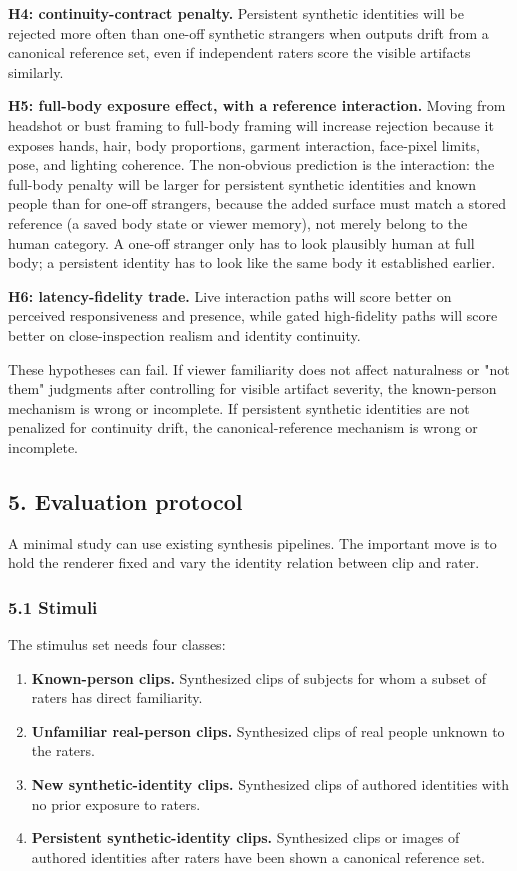\documentclass[
]{article}
\providecommand{\tightlist}{%
  \setlength{\itemsep}{0pt}\setlength{\parskip}{0pt}}
\begin{document}
\textbf{H4: continuity-contract penalty.} Persistent synthetic
identities will be rejected more often than one-off synthetic strangers
when outputs drift from a canonical reference set, even if independent
raters score the visible artifacts similarly.

\textbf{H5: full-body exposure effect, with a reference interaction.}
Moving from headshot or bust framing to full-body framing will increase
rejection because it exposes hands, hair, body proportions, garment
interaction, face-pixel limits, pose, and lighting coherence. The
non-obvious prediction is the interaction: the full-body penalty will be
larger for persistent synthetic identities and known people than for
one-off strangers, because the added surface must match a stored
reference (a saved body state or viewer memory), not merely belong to
the human category. A one-off stranger only has to look plausibly human
at full body; a persistent identity has to look like the same body it
established earlier.

\textbf{H6: latency-fidelity trade.} Live interaction paths will score
better on perceived responsiveness and presence, while gated
high-fidelity paths will score better on close-inspection realism and
identity continuity.

These hypotheses can fail. If viewer familiarity does not affect
naturalness or "not them" judgments after controlling for visible
artifact severity, the known-person mechanism is wrong or incomplete. If
persistent synthetic identities are not penalized for continuity drift,
the canonical-reference mechanism is wrong or incomplete.

\subsection{5. Evaluation protocol}\label{5-evaluation-protocol}

A minimal study can use existing synthesis pipelines. The important move
is to hold the renderer fixed and vary the identity relation between
clip and rater.

\subsubsection{5.1 Stimuli}\label{51-stimuli}

The stimulus set needs four classes:

\begin{enumerate}
\def\labelenumi{\arabic{enumi}.}
\tightlist
\item
  \textbf{Known-person clips.} Synthesized clips of subjects for whom a
  subset of raters has direct familiarity.
\item
  \textbf{Unfamiliar real-person clips.} Synthesized clips of real
  people unknown to the raters.
\item
  \textbf{New synthetic-identity clips.} Synthesized clips of authored
  identities with no prior exposure to raters.
\item
  \textbf{Persistent synthetic-identity clips.} Synthesized clips or
  images of authored identities after raters have been shown a canonical
  reference set.
\end{enumerate}
\end{document}
